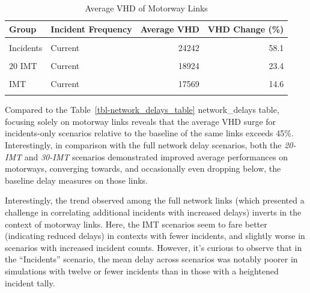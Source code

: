 \documentclass[fancy, oneside, mastersfancy, ms]{byuthesis}
\begin{document}
\hypertarget{tbl-motorway_delays_table}{}
\begin{table}
\caption{\label{tbl-motorway_delays_table}Average VHD of Motorway Links }\tabularnewline

\centering
\begin{tabular}[t]{llrr}
\toprule
\textbf{Group} & \textbf{Incident Frequency} & \textbf{Average VHD} & \textbf{VHD Change (\%)}\\
\midrule
\cellcolor{gray!6}{Baseline} & \cellcolor{gray!6}{-} & \cellcolor{gray!6}{15335} & \cellcolor{gray!6}{0.0}\\
Incidents & Current & 24242 & 58.1\\
\cellcolor{gray!6}{Incidents} & \cellcolor{gray!6}{Increased} & \cellcolor{gray!6}{22321} & \cellcolor{gray!6}{45.6}\\
20 IMT & Current & 18924 & 23.4\\
\cellcolor{gray!6}{20 IMT} & \cellcolor{gray!6}{Increased} & \cellcolor{gray!6}{19176} & \cellcolor{gray!6}{25.0}\\
\addlinespace
30 IMT & Current & 17569 & 14.6\\
\cellcolor{gray!6}{30 IMT} & \cellcolor{gray!6}{Increased} & \cellcolor{gray!6}{18327} & \cellcolor{gray!6}{19.5}\\
\bottomrule
\end{tabular}
\end{table}

Compared to the Table~\ref{tbl-network_delays_table} network\_delays
table, focusing solely on motorway links reveals that the average VHD
surge for incidents-only scenarios relative to the baseline of the same
links exceeds 45\%. Interestingly, in comparison with the full network
delay scenarios, both the \emph{20-IMT} and \emph{30-IMT} scenarios
demonstrated improved average performances on motorways, converging
towards, and occasionally even dropping below, the baseline delay
measures on those links.

Interestingly, the trend observed among the full network links (which
presented a challenge in correlating additional incidents with increased
delays) inverts in the context of motorway links. Here, the IMT
scenarios seem to fare better (indicating reduced delays) in contexts
with fewer incidents, and slightly worse in scenarios with increased
incident counts. However, it's curious to observe that in the
``Incidents'' scenario, the mean delay across scenarios was notably
poorer in simulations with twelve or fewer incidents than in those with
a heightened incident tally.
\end{document}
